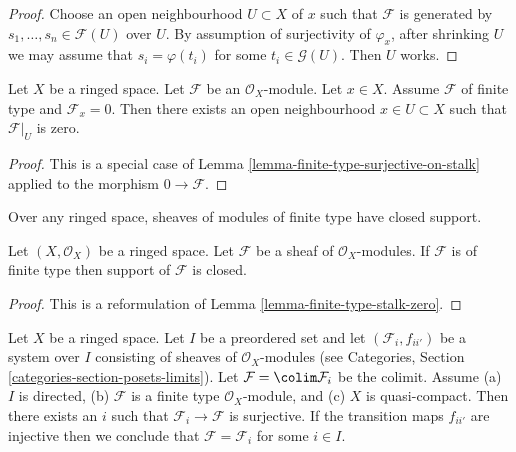 \begin{proof}
Choose an open neighbourhood $U \subset X$ of $x$ such that $\mathcal{F}$ is
generated by $s_1, \ldots, s_n \in \mathcal{F}(U)$ over $U$.
By assumption of surjectivity of $\varphi_x$,
after shrinking $U$ we may assume that $s_i = \varphi(t_i)$
for some $t_i \in \mathcal{G}(U)$.
Then $U$ works.
\end{proof}

\begin{lemma}
\label{lemma-finite-type-stalk-zero}
Let $X$ be a ringed space.
Let $\mathcal{F}$ be an $\mathcal{O}_X$-module.
Let $x \in X$.
Assume $\mathcal{F}$ of finite type and $\mathcal{F}_x = 0$.
Then there exists an open neighbourhood
$x \in U \subset X$ such that $\mathcal{F}|_U$ is zero.
\end{lemma}

\begin{proof}
This is a special case of
Lemma \ref{lemma-finite-type-surjective-on-stalk}
applied to the morphism $0 \to \mathcal{F}$.
\end{proof}

\begin{lemma}
\label{lemma-support-finite-type-closed}
\begin{slogan}
Over any ringed space, sheaves of modules of finite type have closed support.
\end{slogan}
Let $(X, \mathcal{O}_X)$ be a ringed space.
Let $\mathcal{F}$ be a sheaf of $\mathcal{O}_X$-modules.
If $\mathcal{F}$ is of finite type then support of $\mathcal{F}$ is closed.
\end{lemma}

\begin{proof}
This is a reformulation of Lemma \ref{lemma-finite-type-stalk-zero}.
\end{proof}

\begin{lemma}
\label{lemma-finite-type-quasi-compact-colimit}
Let $X$ be a ringed space. Let $I$ be a preordered set and
let $(\mathcal{F}_i, f_{ii'})$ be a system over $I$ consisting of sheaves
of $\mathcal{O}_X$-modules (see
Categories, Section \ref{categories-section-posets-limits}).
Let $\mathcal{F} = \colim \mathcal{F}_i$ be the colimit. Assume
(a) $I$ is directed,
(b) $\mathcal{F}$ is a finite type $\mathcal{O}_X$-module, and
(c) $X$ is quasi-compact. Then there exists an $i$ such that
$\mathcal{F}_i \to \mathcal{F}$ is surjective.
If the transition maps $f_{ii'}$ are injective
then we conclude that $\mathcal{F} = \mathcal{F}_i$ for some $i \in I$.
\end{lemma}

